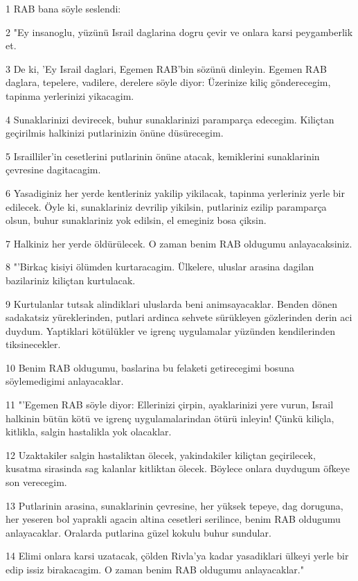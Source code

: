 \par 1 RAB bana söyle seslendi:
\par 2 "Ey insanoglu, yüzünü Israil daglarina dogru çevir ve onlara karsi peygamberlik et.
\par 3 De ki, 'Ey Israil daglari, Egemen RAB'bin sözünü dinleyin. Egemen RAB daglara, tepelere, vadilere, derelere söyle diyor: Üzerinize kiliç gönderecegim, tapinma yerlerinizi yikacagim.
\par 4 Sunaklarinizi devirecek, buhur sunaklarinizi paramparça edecegim. Kiliçtan geçirilmis halkinizi putlarinizin önüne düsürecegim.
\par 5 Israilliler'in cesetlerini putlarinin önüne atacak, kemiklerini sunaklarinin çevresine dagitacagim.
\par 6 Yasadiginiz her yerde kentleriniz yakilip yikilacak, tapinma yerleriniz yerle bir edilecek. Öyle ki, sunaklariniz devrilip yikilsin, putlariniz ezilip paramparça olsun, buhur sunaklariniz yok edilsin, el emeginiz bosa çiksin.
\par 7 Halkiniz her yerde öldürülecek. O zaman benim RAB oldugumu anlayacaksiniz.
\par 8 "'Birkaç kisiyi ölümden kurtaracagim. Ülkelere, uluslar arasina dagilan bazilariniz kiliçtan kurtulacak.
\par 9 Kurtulanlar tutsak alindiklari uluslarda beni animsayacaklar. Benden dönen sadakatsiz yüreklerinden, putlari ardinca sehvete sürükleyen gözlerinden derin aci duydum. Yaptiklari kötülükler ve igrenç uygulamalar yüzünden kendilerinden tiksinecekler.
\par 10 Benim RAB oldugumu, baslarina bu felaketi getirecegimi bosuna söylemedigimi anlayacaklar.
\par 11 "'Egemen RAB söyle diyor: Ellerinizi çirpin, ayaklarinizi yere vurun, Israil halkinin bütün kötü ve igrenç uygulamalarindan ötürü inleyin! Çünkü kiliçla, kitlikla, salgin hastalikla yok olacaklar.
\par 12 Uzaktakiler salgin hastaliktan ölecek, yakindakiler kiliçtan geçirilecek, kusatma sirasinda sag kalanlar kitliktan ölecek. Böylece onlara duydugum öfkeye son verecegim.
\par 13 Putlarinin arasina, sunaklarinin çevresine, her yüksek tepeye, dag doruguna, her yeseren bol yaprakli agacin altina cesetleri serilince, benim RAB oldugumu anlayacaklar. Oralarda putlarina güzel kokulu buhur sundular.
\par 14 Elimi onlara karsi uzatacak, çölden Rivla'ya kadar yasadiklari ülkeyi yerle bir edip issiz birakacagim. O zaman benim RAB oldugumu anlayacaklar."

